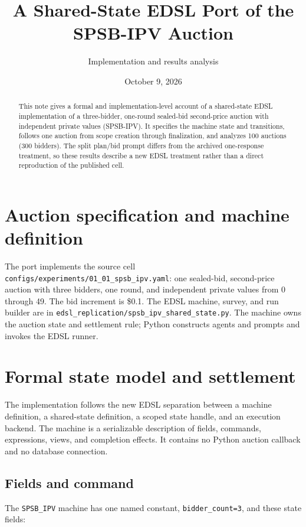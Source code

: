 \documentclass[11pt]{article}
\title{A Shared-State EDSL Port of the SPSB-IPV Auction}
\author{Implementation and results analysis}
\date{October 9, 2026}
\begin{document}
\maketitle

\begin{abstract}
This note gives a formal and implementation-level account of a shared-state EDSL implementation of a three-bidder, one-round sealed-bid second-price auction with independent private values (SPSB-IPV). It specifies the machine state and transitions, follows one auction from scope creation through finalization, and analyzes 100 auctions (300 bidders). The split plan/bid prompt differs from the archived one-response treatment, so these results describe a new EDSL treatment rather than a direct reproduction of the published cell.
\end{abstract}

\section{Auction specification and machine definition}

The port implements the source cell \texttt{configs/experiments/01\_01\_spsb\_ipv.yaml}: one sealed-bid, second-price auction with three bidders, one round, and independent private values from 0 through 49. The bid increment is \$0.1. The EDSL machine, survey, and run builder are in \texttt{edsl\_replication/spsb\_ipv\_shared\_state.py}. The machine owns the auction state and settlement rule; Python constructs agents and prompts and invokes the EDSL runner.

\section{Formal state model and settlement}

The implementation follows the new EDSL separation between a machine definition, a shared-state definition, a scoped state handle, and an execution backend. The machine is a serializable description of fields, commands, expressions, views, and completion effects. It contains no Python auction callback and no database connection.

\subsection{Fields and command}

The \texttt{SPSB\_IPV} machine has one named constant, \texttt{bidder\_count=3}, and these state fields:
\end{document}
